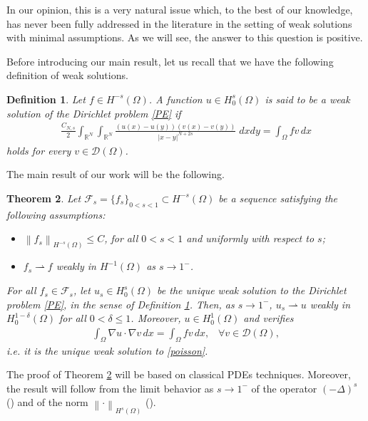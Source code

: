 \documentclass[reqno,twoside]{amsart}
\newtheorem{theorem}{Theorem}[section]
\newtheorem{definition}[theorem]{Definition}
\numberwithin{equation}{section}
\def\RR{{\mathbb{R}}}
\newcommand{\norm}[2]{{\left\|#1\right\|}_{#2}}
\newcommand{\fl}[2]{(-\Delta)^#1#2}
\begin{document}
In our opinion, this is a very natural issue which, to the best of our knowledge, has never been fully addressed in the literature in the setting of weak solutions with minimal assumptions. As we will see, the answer to this question is positive. 

Before introducing our main result, let us recall that we have the following definition of weak solutions. 

\begin{definition}\label{weak_sol_def}
	Let $f\in H^{-s}(\Omega)$. A function $u\in H_0^s(\Omega)$ is said to be a weak solution of the Dirichlet problem \eqref{PE} if 
	\begin{align}\label{weak-sol}
	\frac{C_{N,s}}{2}\int_{\RR^N}\int_{\RR^N}\frac{(u(x)-u(y))(v(x)-v(y))}{|x-y|^{N+2s}}\;dxdy = \int_\Omega  fv\,dx
	\end{align}
	holds for every $v\in\mathcal{D}(\Omega)$.
\end{definition}

The main result of our work will be the following.

\begin{theorem}\label{limit_thm}
	Let $\mathcal{F}_s=\{f_s\}_{0<s<1}\subset H^{-s}(\Omega)$ be a sequence satisfying the following assumptions:
	\begin{itemize}
		\item[$\textbf{H1}$] $\norm{f_s}{H^{-s}(\Omega)}\leq C$, for all $0<s<1$ and uniformly with respect to $s$;
		
		\item[$\textbf{H2}$] $f_s\rightharpoonup f$ weakly in $H^{-1}(\Omega)$ as $s\to 1^-$.
	\end{itemize}		
	For all $f_s\in\mathcal{F}_s$, let $u_s\in H^s_0(\Omega)$ be the unique weak solution to the Dirichlet problem \eqref{PE}, in the sense of Definition \ref{weak_sol_def}. Then, as $s\to 1^-$, $u_s\rightharpoonup u$ weakly in $H^{1-\delta}_0(\Omega)$ for all $0<\delta\leq 1$. Moreover, $u\in H^1_0(\Omega)$ and verifies
\begin{align*}
	\int_{\Omega} \nabla u\cdot\nabla v\,dx = \int_{\Omega}fv\,dx, \;\;\; \forall v\in\mathcal{D}(\Omega),
\end{align*}
i.e. it is the unique weak solution to \eqref{poisson}.
\end{theorem}

The proof of Theorem \ref{limit_thm} will be based on classical PDEs techniques. Moreover, the result will follow from the limit behavior as $s\to 1^-$ of the operator $\fl{s}{}$ (\cite{dihitchhiker,stinga2010extension}) and of the norm $\norm{\cdot}{H^s(\Omega)}$ (\cite{bourgain2001another}).
\end{document}

